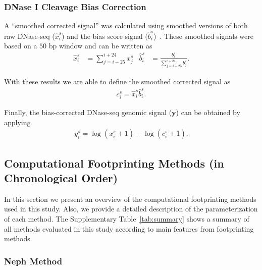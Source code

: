 \documentclass[11pt]{article}
\begin{document}
\subsubsection{DNase I Cleavage Bias Correction}
\label{sec:bias-correction}

A ``smoothed corrected signal'' was calculated using smoothed versions of both raw DNase-seq (${\hat{x}}_{i}^{s}$) and the bias score signal (${\hat{b}}_{i}^{s}$)~\citep{he2014}. These smoothed signals were based on a $50$ bp window and can be written as
\begin{align}
  {\hat{x}}_{i}^{s} &= \sum_{j=i-25}^{i+24} {x}_{j}^{s} & {\hat{b}}_{i}^{s} &= \frac{{b}_{i}^{s}}{\sum_{j=i-25}^{i+24} {b}_{j}^{s}}.
  \label{eq:biassignal}
\end{align}

With these results we are able to define the smoothed corrected signal as
\begin{align}
  {c}_{i}^{s} = {\hat{x}}_{i}^{s} {\hat{b}}_{i}^{s}.
  \label{eq:biascorr}
\end{align}

Finally, the bias-corrected DNase-seq genomic signal ($\mathbf{y}$) can be obtained by applying
\begin{align}
  {y}_{i}^{s} = \log({x}_{i}^{s} + 1) - \log({c}_{i}^{s} + 1).
  \label{eq:biascorrsignal}
\end{align}

{}

\subsection{Computational Footprinting Methods (in Chronological Order)}
\label{sec:fp-methods}

In this section we present an overview of the computational footprinting methods used in this study. Also, we provide a detailed description of the parameterization of each method. The Supplementary Table~\ref{tab:summary} shows a summary of all methods evaluated in this study according to main features from footprinting methods.
			
\subsubsection{Neph Method}
\label{sec:neph}
\end{document}
